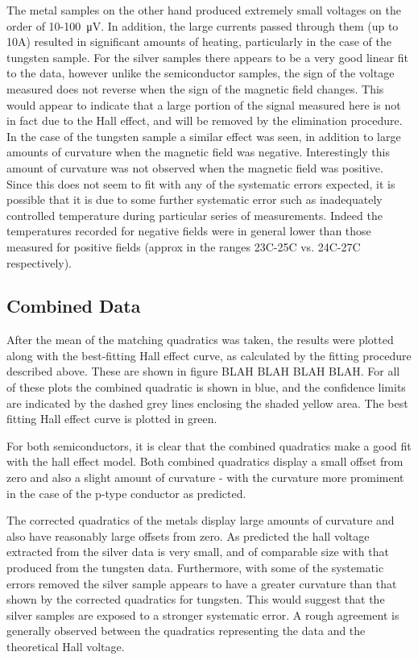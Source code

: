 \documentclass{article}
\begin{document}
			The metal samples on the other hand produced extremely small voltages on the order of 10-100\SI{}{\micro\volt}. In addition, the large currents passed through them (up to 10A) resulted in significant amounts of heating, particularly in the case of the tungsten sample. For the silver samples there appears to be a very good linear fit to the data, however unlike the semiconductor samples, the sign of the voltage measured does not reverse when the sign of the magnetic field changes. This would appear to indicate that a large portion of the signal measured here is not in fact due to the Hall effect, and will be removed by the elimination procedure. In the case of the tungsten sample a similar effect was seen, in addition to large amounts of curvature when the magnetic field was negative. Interestingly this amount of curvature was not observed when the magnetic field was positive. Since this does not seem to fit with any of the systematic errors expected, it is possible that it is due to some further systematic error such as inadequately controlled temperature during particular series of measurements. Indeed the temperatures recorded for negative fields were in general lower than those measured for positive fields (approx in the ranges 23\degree C-25\degree C vs. 24\degree C-27\degree C respectively).
		
		\subsection{Combined Data}
			After the mean of the matching quadratics was taken, the results were plotted along with the best-fitting Hall effect curve, as calculated by the fitting procedure described above. These are shown in figure BLAH BLAH BLAH BLAH. For all of these plots the combined quadratic is shown in blue, and the confidence limits are indicated by the dashed grey lines enclosing the shaded yellow area. The best fitting Hall effect curve is plotted in green.
			
			For both semiconductors, it is clear that the combined quadratics make a good fit with the hall effect model. Both combined quadratics display a small offset from zero and also a slight amount of curvature - with the curvature more promiment in the case of the p-type conductor as predicted.
			
			The corrected quadratics of the metals display large amounts of curvature and also have reasonably large offsets from zero. As predicted the hall voltage extracted from the silver data is very small, and of comparable size with that produced from the tungsten data. Furthermore, with some of the systematic errors removed the silver sample appears to have a greater curvature than that shown by the corrected quadratics for tungsten. This would suggest that the silver samples are exposed to a stronger systematic error. A rough agreement is generally observed between the quadratics representing the data and the theoretical Hall voltage.
		
\end{document}
